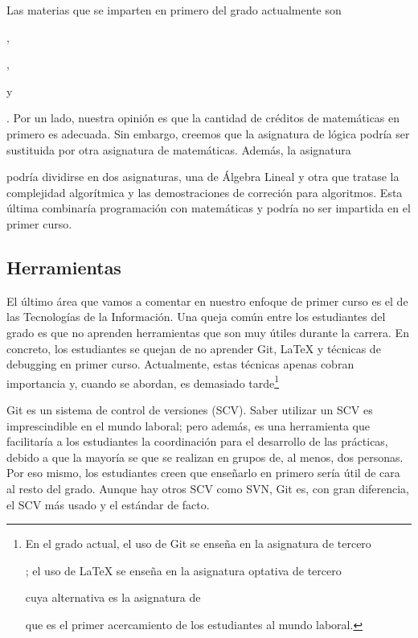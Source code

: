 Las materias que se imparten en primero del grado actualmente son
\subject{Álgebra y Matemática Discreta},
\subject{Fundamentos Lógicos de la Informática}\footnotemark,
\subject{Cálculo} y
\subject{Estadística}.
Por un lado, nuestra opinión es que
la cantidad de créditos de matemáticas en primero es adecuada.
Sin embargo, creemos que la asignatura de lógica
podría ser sustituida por otra asignatura de matemáticas.
Además, la asignatura \subject{Álgebra y Matemática Discreta}
podría dividirse en dos asignaturas,
una de Álgebra Lineal y otra que tratase
la complejidad algorítmica y las demostraciones de correción para algoritmos.
Esta última combinaría programación con matemáticas
y podría no ser impartida en el primer curso.


\subsection{Herramientas}


El último área que vamos a comentar en nuestro enfoque de primer curso
es el de las Tecnologías de la Información.
Una queja común entre los estudiantes del grado es que
no aprenden herramientas que son muy útiles durante la carrera.
En concreto, los estudiantes se quejan de no aprender
Git, \LaTeX{} y técnicas de debugging en primer curso.
Actualmente, estas técnicas apenas cobran importancia y, cuando se abordan,
es demasiado tarde\footnote{En el grado actual, el uso de Git se enseña
en la asignatura de tercero \subject{Tecnologías de Desarrollo Software};
el uso de \LaTeX{} se enseña en la asignatura optativa de tercero
\subject{Tecnologías Específicas de la Ingeniería Informática} cuya alternativa
es la asignatura de \subject{Prácticas Externas} que es el primer acercamiento
de los estudiantes al mundo laboral.}

Git es un sistema de control de versiones (SCV).
Saber utilizar un SCV es imprescindible en el mundo laboral;
pero además,
es una herramienta que facilitaría a los estudiantes la coordinación para
el desarrollo de las prácticas,
debido a que la mayoría se que se realizan en grupos de, al menos, dos personas.
Por eso mismo, los estudiantes creen que enseñarlo en primero
sería útil de cara al resto del grado.
Aunque hay otros SCV como SVN,
Git es, con gran diferencia, el SCV más usado y el estándar de facto.

